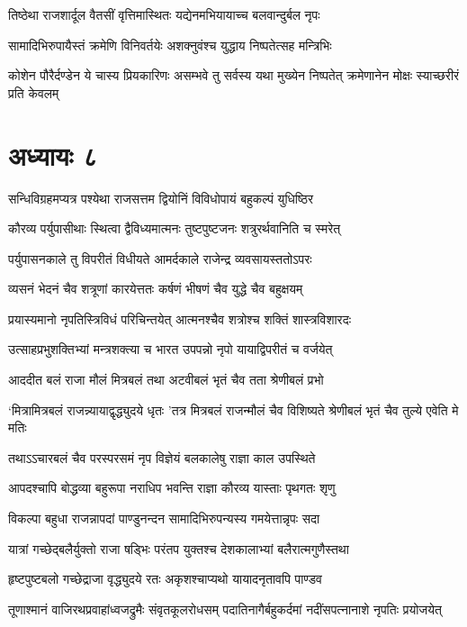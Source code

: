 \threelineshloka
{तिष्ठेथा राजशार्दूल वैतसीं वृत्तिमास्थितः}
{यद्येनमभियायाच्च बलवान्दुर्बल नृपः}
{}


\twolineshloka
{सामादिभिरुपायैस्तं क्रमेणि विनिवर्तयेः}
{अशक्नुवंश्च युद्धाय निष्पतेत्सह मन्त्रिभिः}


\threelineshloka
{कोशेन पौरैर्दण्डेन ये चास्य प्रियकारिणः}
{असम्भवे तु सर्वस्य यथा मुख्येन निष्पतेत्}
{क्रमेणानेन मोक्षः स्याच्छरीरं प्रति केवलम्}


\chapter{अध्यायः ८}
\twolineshloka
{सन्धिविग्रहमप्यत्र पश्येथा राजसत्तम}
{द्वियोनिं विविधोपायं बहुकल्पं युधिष्ठिर}


\twolineshloka
{कौरव्य पर्युपासीथाः स्थित्वा द्वैविध्यमात्मनः}
{तुष्टपुष्टजनः शत्रुरर्थवानिति च स्मरेत्}


\twolineshloka
{पर्युपासनकाले तु विपरीतं विधीयते}
{आमर्दकाले राजेन्द्र व्यवसायस्ततोऽपरः}


\twolineshloka
{व्यसनं भेदनं चैव शत्रूणां कारयेत्ततः}
{कर्षणं भीषणं चैव युद्धे चैव बहुक्षयम्}


\twolineshloka
{प्रयास्यमानो नृपतिस्त्रिविधं परिचिन्तयेत्}
{आत्मनश्चैव शत्रोश्च शक्तिं शास्त्रविशारदः}


\twolineshloka
{उत्साहप्रभुशक्तिभ्यां मन्त्रशक्त्या च भारत}
{उपपन्नो नृपो यायाद्विपरीतं च वर्जयेत्}


\twolineshloka
{आददीत बलं राजा मौलं मित्रबलं तथा}
{अटवीबलं भृतं चैव तता श्रेणीबलं प्रभो}


\threelineshloka
{`मित्रामित्रबलं राजन्न्यायाद्वृद्ध्युदये धृतः}
{'तत्र मित्रबलं राजन्मौलं चैव विशिष्यते}
{श्रेणीबलं भृतं चैव तुल्ये एवेति मे मतिः}


\twolineshloka
{तथाऽऽचारबलं चैव परस्परसमं नृप}
{विज्ञेयं बलकालेषु राज्ञा काल उपस्थिते}


\twolineshloka
{आपदश्चापि बोद्धव्या बहुरूपा नराधिप}
{भवन्ति राज्ञा कौरव्य यास्ताः पृथगतः शृणु}


\twolineshloka
{विकल्पा बहुधा राजन्नापदां पाण्डुनन्दन}
{सामादिभिरुपन्यस्य गमयेत्तान्नृपः सदा}


\twolineshloka
{यात्रां गच्छेद्बलैर्युक्तो राजा षड्भिः परंतप}
{युक्तश्च देशकालाभ्यां बलैरात्मगुणैस्तथा}


\twolineshloka
{हृष्टपुष्टबलो गच्छेद्राजा वृद्ध्युदये रतः}
{अकृशश्चाप्यथो यायादनृतावपि पाण्डव}


\twolineshloka
{तूणाश्मानं वाजिरथप्रवाहांध्वजद्रुमैः संवृतकूलरोधसम्}
{पदातिनागैर्बहुकर्दमां नदींसपत्नानाशे नृपतिः प्रयोजयेत्}


